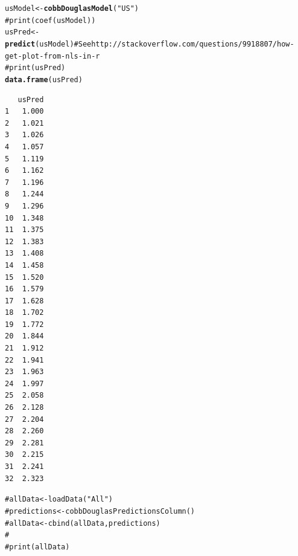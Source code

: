 \documentclass[preprint,authoryear,12pt]{elsarticle}\usepackage{graphicx, color}
\makeatletter
\newcommand{\hlfunctioncall}[1]{\textcolor[rgb]{0.501960784313725,0,0.329411764705882}{\textbf{#1}}}%
\newcommand{\hlstring}[1]{\textcolor[rgb]{0.6,0.6,1}{#1}}%
\newcommand{\hlcomment}[1]{\textcolor[rgb]{0.180392156862745,0.6,0.341176470588235}{#1}}%
\newenvironment{kframe}{%
 \def\at@end@of@kframe{}%
 \ifinner\ifhmode%
  \def\at@end@of@kframe{\end{minipage}}%
  \begin{minipage}{\columnwidth}%
 \fi\fi%
 \def\FrameCommand##1{\hskip\@totalleftmargin \hskip-\fboxsep
 \colorbox{shadecolor}{##1}\hskip-\fboxsep
     \hskip-\linewidth \hskip-\@totalleftmargin \hskip\columnwidth}%
 \MakeFramed {\advance\hsize-\width
   \@totalleftmargin\z@ \linewidth\hsize
   \@setminipage}}%
 {\par\unskip\endMakeFramed%
 \at@end@of@kframe}
\newenvironment{knitrout}{}{} %
\makeatother
\begin{document}
\begin{knitrout}
\color{fgcolor}\begin{kframe}
\begin{alltt}
usModel <- \hlfunctioncall{cobbDouglasModel}(\hlstring{"US"})
\hlcomment{# print(coef(usModel))}
usPred <- \hlfunctioncall{predict}(usModel) \hlcomment{#See http://stackoverflow.com/questions/9918807/how-get-plot-from-nls-in-r}
\hlcomment{#print(usPred)}
\hlfunctioncall{data.frame}(usPred)
\end{alltt}
\begin{verbatim}
   usPred
1   1.000
2   1.021
3   1.026
4   1.057
5   1.119
6   1.162
7   1.196
8   1.244
9   1.296
10  1.348
11  1.375
12  1.383
13  1.408
14  1.458
15  1.520
16  1.579
17  1.628
18  1.702
19  1.772
20  1.844
21  1.912
22  1.941
23  1.963
24  1.997
25  2.058
26  2.128
27  2.204
28  2.260
29  2.281
30  2.215
31  2.241
32  2.323
\end{verbatim}
\begin{alltt}

\hlcomment{# allData <- loadData("All")}
\hlcomment{# predictions <- cobbDouglasPredictionsColumn()}
\hlcomment{# allData <- cbind(allData, predictions)}
\hlcomment{# }
\hlcomment{# print(allData)}
\end{alltt}
\end{kframe}
\end{knitrout}
\end{document}
